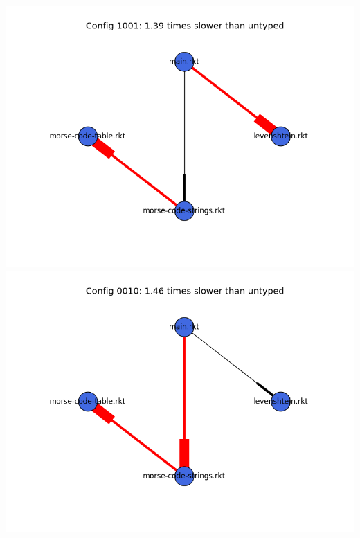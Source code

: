 \documentclass{article}
\begin{document}
\begin{itemize}
\includegraphics[width=\textwidth]{morse-code-module-graph-1001.png}
\includegraphics[width=\textwidth]{morse-code-module-graph-0010.png}
\end{itemize}
\end{document}

